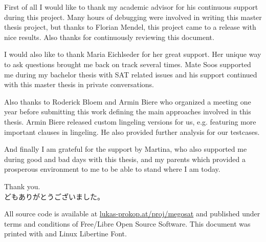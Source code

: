\documentclass[11pt,a4paper,final,openright]{book}
\numberwithin{theorem}{chapter}
\numberwithin{defi}{chapter}
\numberwithin{prop}{chapter}
\begin{document}


\begin{acknowledgements}%
  \parskip5pt
  First of all I would like to thank my academic advisor for his continuous support
  during this project. Many hours of debugging were involved in writing this
  master thesis project, but thanks to Florian Mendel, this project came to a release
  with nice results. Also thanks for continuously reviewing this document.

  I would also like to thank Maria Eichlseder for her great support. Her unique
  way to ask questions brought me back on track several times.
  Mate Soos supported me during my bachelor thesis with SAT related issues
  and his support continued with this master thesis in private conversations.

  Also thanks to Roderick Bloem and Armin Biere who organized a meeting
  one year before submitting this work defining the main approaches involved
  in this thesis. Armin Biere released custom lingeling versions for us,
  e.g. featuring more important clauses in lingeling. He also provided further
  analysis for our testcases.

  And finally I am grateful for the support by Martina,
  who also supported me during good and bad days with this thesis,
  and my parents which provided a prosperous environment to me
  to be able to stand where I am today.

  Thank you. \\
  \indent どもありがとうございました。
\end{acknowledgements}

All source code is available at \href{http://lukas-prokop.at/proj/megosat}{lukas-prokop.at/proj/megosat}
and published under terms and conditions of Free/Libre Open Source Software.
This document was printed with \LuaLaTeX{} and Linux Libertine Font.


\tableofcontents
\mainmatter










\backmatter
\printindex
\printbibliography
\end{document}
